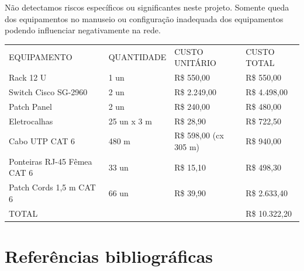 \documentclass[	DIV=calc,
							paper=a4,
							fontsize=12pt,
							onecolumn]{scrartcl}
\begin{document}
Não detectamos riscos específicos ou significantes neste projeto. Somente queda dos equipamentos no manuseio ou configuração inadequada dos equipamentos podendo influenciar negativamente na rede.

\begin{table}[]
	\begin{tabular}{llll}
		EQUIPAMENTO                 & QUANTIDADE  & CUSTO UNITÁRIO        & CUSTO TOTAL   \\
		Rack 12 U                   & 1 un        & R\$ 550,00            & R\$ 550,00    \\
		Switch Cisco SG-2960        & 2 un        & R\$ 2.249,00          & R\$ 4.498,00  \\
		Patch Panel                 & 2 un        & R\$ 240,00            & R\$ 480,00    \\
		Eletrocalhas                & 25 un x 3 m & R\$ 28,90             & R\$ 722,50    \\
		Cabo UTP CAT 6              & 480 m       & R\$ 598,00 (cx 305 m) & R\$ 940,00    \\
		Ponteiras RJ-45 Fêmea CAT 6 & 33 un       & R\$ 15,10             & R\$ 498,30    \\
		Patch Cords 1,5 m CAT 6     & 66 un       & R\$ 39,90             & R\$ 2.633,40  \\
		\multicolumn{3}{l}{TOTAL}                                         & R\$ 10.322,20
	\end{tabular}
\end{table}

\section{Referências bibliográficas}



\renewcommand\refname{} %

  
\end{document}
